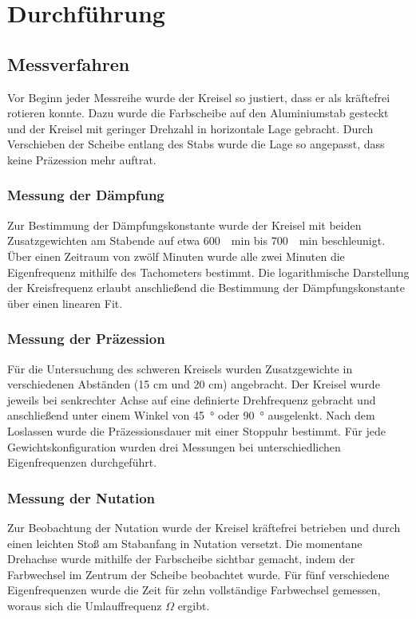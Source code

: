 \chapter{Durchführung} \label{ch:Durchfuehrung}

\section{Messverfahren} \label{sec:Messverfahren}

Vor Beginn jeder Messreihe wurde der Kreisel so justiert, dass er als kräftefrei rotieren konnte.  
Dazu wurde die Farbscheibe auf den Aluminiumstab gesteckt und der Kreisel mit geringer Drehzahl in horizontale Lage gebracht.  
Durch Verschieben der Scheibe entlang des Stabs wurde die Lage so angepasst, dass keine Präzession mehr auftrat.

\subsection{Messung der Dämpfung}

Zur Bestimmung der Dämpfungskonstante wurde der Kreisel mit beiden Zusatzgewichten am Stabende auf etwa \SI{600}{\per\minute} bis \SI{700}{\per\minute} beschleunigt.  
Über einen Zeitraum von zwölf Minuten wurde alle zwei Minuten die Eigenfrequenz mithilfe des Tachometers bestimmt.  
Die logarithmische Darstellung der Kreisfrequenz erlaubt anschließend die Bestimmung der Dämpfungskonstante über einen linearen Fit.

\subsection{Messung der Präzession}

Für die Untersuchung des schweren Kreisels wurden Zusatzgewichte in verschiedenen Abständen (15 cm und 20 cm) angebracht.  
Der Kreisel wurde jeweils bei senkrechter Achse auf eine definierte Drehfrequenz gebracht und anschließend unter einem Winkel von \SI{45}{\degree} oder \SI{90}{\degree} ausgelenkt.  
Nach dem Loslassen wurde die Präzessionsdauer mit einer Stoppuhr bestimmt.  
Für jede Gewichtskonfiguration wurden drei Messungen bei unterschiedlichen Eigenfrequenzen durchgeführt.

\subsection{Messung der Nutation}

Zur Beobachtung der Nutation wurde der Kreisel kräftefrei betrieben und durch einen leichten Stoß am Stabanfang in Nutation versetzt.  
Die momentane Drehachse wurde mithilfe der Farbscheibe sichtbar gemacht, indem der Farbwechsel im Zentrum der Scheibe beobachtet wurde.  
Für fünf verschiedene Eigenfrequenzen wurde die Zeit für zehn vollständige Farbwechsel gemessen, woraus sich die Umlauffrequenz $\Omega$ ergibt.

